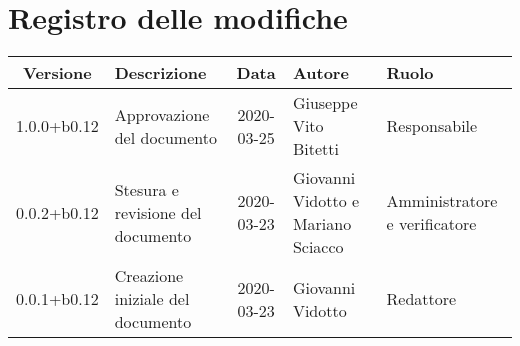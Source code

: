 \section*{Registro delle modifiche}

\begin{center}
	\begin{longtable}{|c|p{3.5cm}|c|p{3cm}|p{3cm}|}
	\hline
	\rowcolor{lighter-grayer}
	\textbf{Versione} & \textbf{Descrizione} & \textbf{Data} & \textbf{Autore} & \textbf{Ruolo} \\
	\hline
	\endfirsthead

	1.0.0+b0.12 & Approvazione del documento & 2020-03-25 & Giuseppe Vito Bitetti & Responsabile \\
	\hline
	0.0.2+b0.12 & Stesura e revisione del documento & 2020-03-23 & Giovanni Vidotto e Mariano Sciacco & Amministratore e verificatore \\
	\hline
	0.0.1+b0.12 & Creazione iniziale del documento & 2020-03-23 & Giovanni Vidotto & Redattore \\
	\hline

	\end{longtable}
\end{center}
